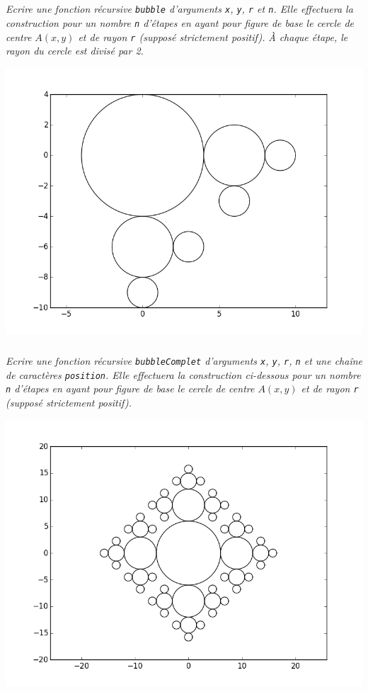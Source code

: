 \subparagraph{}
\textit{Ecrire une fonction récursive \texttt{bubble} d'arguments \texttt{x}, \texttt{y}, \texttt{r} et \texttt{n}. Elle 
effectuera la construction pour un nombre \texttt{n} d'étapes en ayant pour figure de base le cercle de centre $A(x, y)$ 
et de rayon \texttt{r} (supposé strictement positif).}
\textit{À chaque étape, le rayon du cercle est divisé par 2.}
\begin{center}
\includegraphics[width=.65\linewidth]{images/fig_03}
\end{center}

\subparagraph{}
\textit{Ecrire une fonction récursive \texttt{bubbleComplet} d'arguments \texttt{x}, \texttt{y}, \texttt{r}, \texttt{n} 
et une chaîne de caractères \texttt{position}. Elle effectuera la construction ci-dessous pour un nombre \texttt{n} 
d'étapes en ayant pour figure de base le cercle de centre $A(x, y)$ et de rayon \texttt{r} (supposé strictement 
positif).}
\begin{center}
\includegraphics[width=.65\linewidth]{images/bulles}
\end{center}

